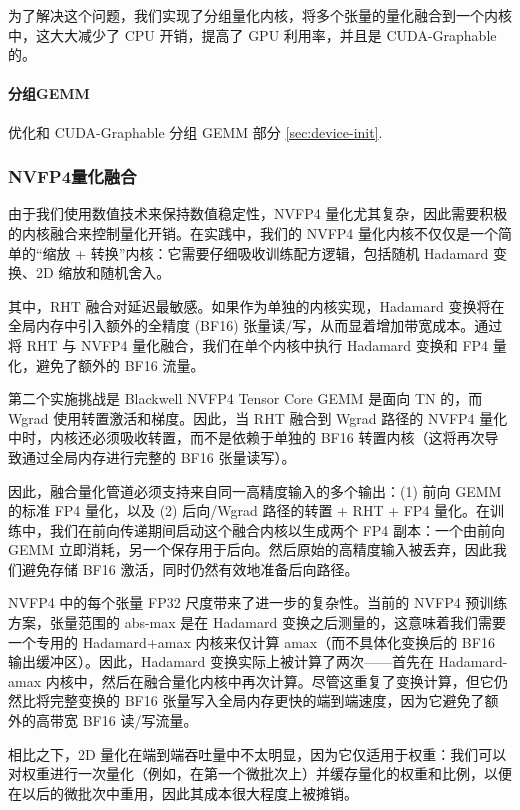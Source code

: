 \documentclass[10pt,logo,copyright]{nvidiatechreport_zh}
\begin{document}
为了解决这个问题，我们实现了分组量化内核，将多个张量的量化融合到一个内核中，这大大减少了 CPU 开销，提高了 GPU 利用率，并且是 CUDA-Graphable 的。

\paragraph{分组GEMM}
优化和 CUDA-Graphable 分组 GEMM 部分 \ref{sec:device-init}.


\subsubsection{NVFP4量化融合}\label{sec:fp4-quant-fusion}

由于我们使用数值技术来保持数值稳定性，NVFP4 量化尤其复杂，因此需要积极的内核融合来控制量化开销。在实践中，我们的 NVFP4 量化内核不仅仅是一个简单的“缩放 + 转换”内核：它需要仔细吸收训练配方逻辑，包括随机 Hadamard 变换、2D 缩放和随机舍入。 

其中，RHT 融合对延迟最敏感。如果作为单独的内核实现，Hadamard 变换将在全局内存中引入额外的全精度 (BF16) 张量读/写，从而显着增加带宽成本。通过将 RHT 与 NVFP4 量化融合，我们在单个内核中执行 Hadamard 变换和 FP4 量化，避免了额外的 BF16 流量。

第二个实施挑战是 Blackwell NVFP4 Tensor Core GEMM 是面向 TN 的，而 Wgrad 使用转置激活和梯度。因此，当 RHT 融合到 Wgrad 路径的 NVFP4 量化中时，内核还必须吸收转置，而不是依赖于单独的 BF16 转置内核（这将再次导致通过全局内存进行完整的 BF16 张量读写）。

因此，融合量化管道必须支持来自同一高精度输入的多个输出：(1) 前向 GEMM 的标准 FP4 量化，以及 (2) 后向/Wgrad 路径的转置 + RHT + FP4 量化。在训练中，我们在前向传递期间启动这个融合内核以生成两个 FP4 副本：一个由前向 GEMM 立即消耗，另一个保存用于后向。然后原始的高精度输入被丢弃，因此我们避免存储 BF16 激活，同时仍然有效地准备后向路径。

NVFP4 中的每个张量 FP32 尺度带来了进一步的复杂性。当前的 NVFP4 预训练方案，张量范围的 abs-max 是在 Hadamard 变换之后测量的，这意味着我们需要一个专用的 Hadamard+amax 内核来仅计算 amax（而不具体化变换后的 BF16 输出缓冲区）。因此，Hadamard 变换实际上被计算了两次——首先在 Hadamard-amax 内核中，然后在融合量化内核中再次计算。尽管这重复了变换计算，但它仍然比将完整变换的 BF16 张量写入全局内存更快的端到端速度，因为它避免了额外的高带宽 BF16 读/写流量。

相比之下，2D 量化在端到端吞吐量中不太明显，因为它仅适用于权重：我们可以对权重进行一次量化（例如，在第一个微批次上）并缓存量化的权重和比例，以便在以后的微批次中重用，因此其成本很大程度上被摊销。 
\end{document}
